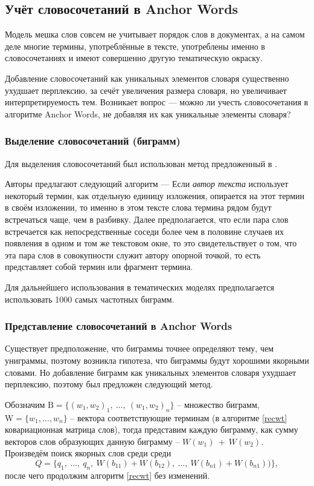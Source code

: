 \documentclass[a4paper, 14pt]{extarticle}
\begin{document}
\subsection{Учёт словосочетаний в Anchor Words}
Модель мешка слов совсем не учитывает порядок слов в документах, а на самом деле многие термины, употреблённые в тексте, употреблены именно в словосочетаниях и имеют совершенно другую тематическую окраску.

Добавление словосочетаний как уникальных элементов словаря существенно ухудшает перплексию, за сечёт увеличения размера словаря, но увеличивает интерпретируемость тем. Возникает вопрос --- можно ли учесть словосочетания в алгоритме Anchor Words, не добавляя их как уникальные элементы словаря?

\subsubsection*{Выделение словосочетаний (биграмм) }
Для выделения словосочетаний был использован метод предложенный в \cite{Dobrov2001}.

Авторы предлагают следующий алгоритм --- Если \emph{автор текста} использует некоторый термин, как отдельную единицу изложения, опирается на этот термин в своём изложении, то именно в этом тексте слова термина рядом будут встречаться чаще, чем в разбивку. Далее предполагается, что если пара слов встречается как непосредственные соседи более чем в половине случаев их появления в одном и том же текстовом окне, то это свидетельствует о том, что эта пара слов в совокупности служит автору опорной точкой, то есть представляет собой термин или фрагмент термина.

Для дальнейшего использования в тематических моделях предполагается использовать 1000 самых частотных биграмм.

\subsubsection*{Представление словосочетаний в Anchor Words}
Существует предположение, что биграммы точнее определяют тему, чем униграммы, поэтому возникла гипотеза, что биграммы будут хорошими якорными словами. Но добавление биграмм как уникальных элементов словаря ухудшает перплексию, поэтому был предложен следующий метод.

Обозначим $\textrm{B} = \{(w_1, w_2)_1,~\dots,~(w_1, w_2)_n\}$ -- множество биграмм,  $\textrm{W} =\{w_1, \dots, w_n\}$ -- вектора соответствующие терминам (в алгоритме \ref{recwt} ковариационная матрица слов), тогда представим каждую биграмму, как сумму векторов слов образующих данную биграмму -- $W(w_1)~+~W(w_2)$.
Произведём поиск якорных слов среди среди $$Q = \{q_1,~\dots,~q_n,~W(b_{11}) + W(b_{12}),~\dots,~W(b_{n1}) + W(b_{n1}))\},$$
после чего продолжим алгоритм \ref{recwt} без изменений. 
\end{document}
